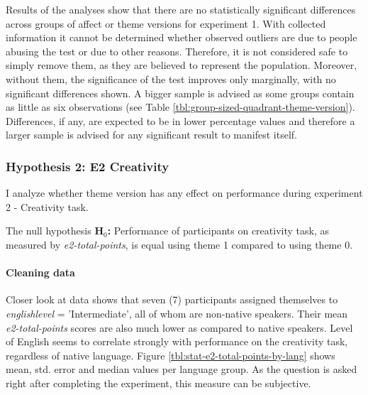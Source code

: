 		Results of the analyses show that there are no statistically significant differences across groups of affect or theme versions for experiment 1. With collected information it cannot be determined whether observed outliers are due to people abusing the test or due to other reasons. Therefore, it is not considered safe to simply remove them, as they are believed to represent the population. Moreover, without them, the significance of the test improves only marginally, with no significant differences shown. A bigger sample is advised as some groups contain as little as six observations (see Table \ref{tbl:group-sized-quadrant-theme-version}). Differences, if any, are expected to be in lower percentage values and therefore a larger sample is advised for any significant result to manifest itself.
		

	
	\subsubsection{Hypothesis 2: E2 Creativity}
	
	I analyze whether theme version has any effect on performance during experiment 2 - Creativity task.
	
	The null hypothesis \textbf{H$_{0}$:} Performance of participants on creativity task, as measured by \textit{e2-total-points}, is equal using theme 1 compared to using theme 0.
	
	\paragraph{Cleaning data}
	
	
	Closer look at data shows that seven (7) participants assigned themselves to \textit{englishlevel} = 'Intermediate', all of whom are non-native speakers. Their mean \textit{e2-total-points} scores are also much lower as compared to native speakers. Level of English seems to correlate strongly with performance on the creativity task, regardless of native language. Figure \ref{tbl:stat-e2-total-points-by-lang} shows mean, std. error and median values per language group. As the question is asked right after completing the experiment, this measure can be subjective.
	
